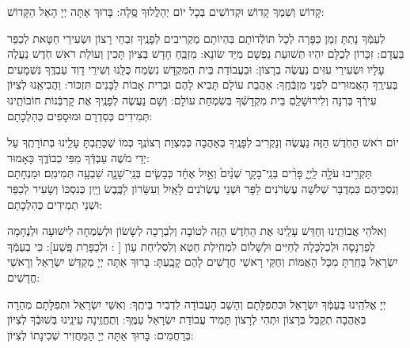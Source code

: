 \documentclass[twoside, openany, parskip=half, 11pt]{book}
\begin{document}
\specialsameisim

\weekdaysakedusha

 קָדוֹשׁ וְשִׁמְךָ קָדוֹשׁ וּקְדוֹשִׁים בְּכָל יוֹם יְהַלֲלוּךָ סֶּֽלָה: בָּרוּךְ אַתָּה יְיָ הָאֵל הַקָּדוֹשׁ:

 לְעַמְּֿךָ נָתַתָּ זְמַן כַּפָּרָה לְכָל תּוֹלְֿדוֹתָם בִּהְיוֹתָם מַקְרִיבִים לְפָנֶֽיךָ זִבְחֵי רָצוֹן וּשְׂעִירֵי חַטָּאת לְכַפֵּר בַּעֲדָם: זִכָּרוֹן לְכֻלָּם יִהְיוּ תְּשׁוּעַת נַפְשָׁם מִיַּד שׂוֹנֵא: מִזְבֵּֽחַ חָדָשׁ בְּצִיּוֹן תָּכִין וְעוֹלַת רֹאשׁ חֹֽדֶשׁ נַעֲלֶה עָלָיו וּשְׂעִירֵי עִזִּים נַעֲשֶׂה בְרָצוֹן: וּבַעֲבוֹדַת בֵּית הַמִּקְדָּשׁ נִשְׂמַח כֻּלָּֽנוּ וְשִׁירֵי דָוִד עַבְדֶּֽךָ נִּשְׁמָעִים בְּעִירֶֽךָ הָאֲמוּרִים לִפְנֵי מִזְבְּֿחֶֽךָ: אַהֲבַת עוֹלָם תָּבִיא לָהֶם וּבְרִית אָבוֹת לַבָּנִים תִּזְכּוֹר: וַהֲבִיאֵֽנוּ לְצִיּוֹן עִירְֿךָ בְּרִנָּה וְלִירוּשָׁלַֽםִ בֵּית מִקְדָשְֿׁךָ בְּשִׂמְחַת עוֹלָם: וְשָׁם נַעֲשֶׂה לְפָנֶֽיךָ אֶת קָרְבְּֿנוֹת חוֹבוֹתֵֽינוּ תְּמִידִים כְּסִדְרָם וּמוּסָפִים כְּהִלְכָתָם:

 יוֹם רֹאשׁ הַחֹֽדֶשׁ 
הַזֶּה נַעֲשֶׂה וְנַקְרִיב לְפָנֶֽיךָ בְּאַהֲבָה כְּמִצְוַת רְצוֹנֶֽךָ כְּמוֹ שֶׁכָּתַֽבְתָּ עָלֵֽינוּ בְּתוֹרָתֶֽךָ עַל יְדֵי מֹשֶׁה עַבְדְּֿךָ מִפִּי כְבוֹדֶֽךָ כָּאָמוּר:\\
 תַּקְרִ֥יבוּ עֹלָ֖ה לַֽיְיָ֑ פָּרִ֨ים בְּנֵֽי־בָקָ֤ר שְׁנַ֨יִם֙ וְאַ֣יִל אֶחָ֔ד כְּבָשִׂ֧ים בְּנֵֽי־שָׁנָ֛ה שִׁבְעָ֖ה תְּמִימִֽם׃ וּמִנְחָתָם וְנִסְכֵּיהֶם כִּמְדֻבָּר שְׁלֹשָׁה עֶשְׂרֹנִים לַפָּר וּשְׁנֵי עֶשְׂרֹנִים לָאָֽיִל וְעִשָּׂרוֹן לַכֶּֽבֶשׂ וְיַֽיִן כְּנִסְכּוֹ וְשָׂעִיר לְכַפֵּר וּשְׁנֵי תְמִידִים כְּהִלְכָתָם:

 וֵאלֹהֵי אֲבוֹתֵֽינוּ וְחַדֵּשׁ עָלֵֽינוּ אֶת הַחֹֽדֶשׁ הַזֶּה לְטוֹבָה וְלִבְרָכָה לְשָׂשׂוֹן וּלְשִׂמְחָה לִישׁוּעָה וּלְנֶחָמָה לְפַרְנָסָה וּלְכַלְכָּלָה לְחַיִּים וּלְשָׁלוֹם לִמְחִֽילַת חֵטְא וְלִסְלִיחַת עָוֹן [
: וּלְכַפָּרַת פָּֽשַׁע]: כִּי בְעַמְּֿךָ יִשְׂרָאֵל בָּחַֽרְתָּ מִכָּל הָאֻמּוֹת וְחֻקֵּי רָאשֵׁי חֳדָשִׁים לָהֶם קָבָֽעְתָּ: בָּרוּךְ אַתָּה יְיָ מְקַדֵּשׁ יִשְׂרָאֵל וְרָאשֵׁי חֳדָשִׁים: 

 יְיָ אֱלֹהֵֽינוּ בְּעַמְּֿךָ יִשְׂרָאֵל וּבִתְפִלָּתָם וְהָשֵׁב הָעֲבוֹדָה לִדְבִיר בֵּיתֶֽךָ: וְאִשֵּׁי יִשְׂרָאֵל וּתְפִלָּתָם מְהֵרָה בְּאַהֲבָה תְקַבֵּל בְּרָצוֹן וּתְהִי לְרָצוֹן תָּמִיד עֲבוֹדַת יִשְׂרָאֵל עַמֶּֽךָ: וְתֶחֱזֶֽינָה עֵינֵֽינוּ בְּשׁוּבְֿךָ לְצִיּוֹן בְּרַחֲמִים: בָּרוּךְ אַתָּה יְיָ הַמַּחֲזִיר שְׁכִינָתוֹ לְצִיּוֹן:

\modim
\end{document}
